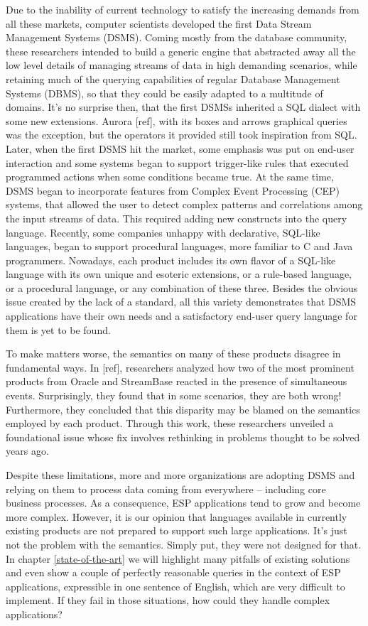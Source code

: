 \documentclass{report}
\begin{document}
Due to the inability of current technology to satisfy the increasing demands from all these markets, computer scientists developed the first Data Stream Management Systems (DSMS). Coming mostly from the database community, these researchers intended to build a generic engine that abstracted away all the low level details of managing streams of data in high demanding scenarios, while retaining much of the querying capabilities of regular Database Management Systems (DBMS), so that they could be easily adapted to a multitude of domains. It's no surprise then, that the first DSMSs inherited a SQL dialect with some new extensions. Aurora [ref], with its boxes and arrows graphical queries was the exception, but the operators it provided still took inspiration from SQL. Later, when the first DSMS hit the market, some emphasis was put on end-user interaction and some systems began to support trigger-like rules that executed programmed actions when some conditions became true. At the same time, DSMS began to incorporate features from Complex Event Processing (CEP) systems, that allowed the user to detect complex patterns and correlations among the input streams of data. This required adding new constructs into the query language. Recently, some companies unhappy with declarative, SQL-like languages, began to support procedural languages, more familiar to C and Java programmers. Nowadays, each product includes its own flavor of a SQL-like language with its own unique and esoteric extensions, or a rule-based language, or a procedural language, or any combination of these three. Besides the obvious issue created by the lack of a standard, all this variety demonstrates that DSMS applications have their own needs and a satisfactory end-user query language for them is yet to be found.

To make matters worse, the semantics on many of these products disagree in fundamental ways. In [ref], researchers analyzed how two of the most prominent products from Oracle and StreamBase reacted in the presence of simultaneous events. Surprisingly, they found that in some scenarios, they are both wrong! Furthermore, they concluded that this disparity may be blamed on the semantics employed by each product. Through this work, these researchers unveiled a foundational issue whose fix involves rethinking in problems thought to be solved years ago.

Despite these limitations, more and more organizations are adopting DSMS and relying on them to process data coming from everywhere -- including core business processes. As a consequence, ESP applications tend to grow and become more complex. However, it is our opinion that languages available in currently existing products are not prepared to support such large applications. It's just not the problem with the semantics. Simply put, they were not designed for that. In chapter \ref{state-of-the-art} we will highlight many pitfalls of existing solutions and even show a couple of perfectly reasonable queries in the context of ESP applications, expressible in one sentence of English, which are very difficult to implement. If they fail in those situations, how could they handle complex applications?
\end{document}
